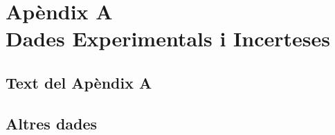 \documentclass[a4paper,11pt]{report}
\renewcommand{\thesection}{\thechapter.\arabic{section}} %
\begin{document}
	\chapter*{Apèndix A\\[0.5cm] Dades Experimentals i Incerteses}
	
	\setcounter{section}{0} %
	\renewcommand{\thesection}{A.\arabic{section}} %
	
	\section{Text del Apèndix A} %
	
	\section{Altres dades} %
	
\end{document}
